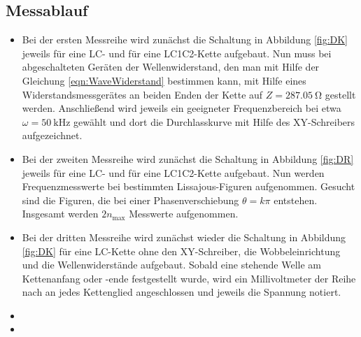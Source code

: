 \subsection{Messablauf}

\begin{itemize}

\item
Bei der ersten Messreihe wird zunächst die Schaltung in Abbildung
\ref{fig:DK} jeweils für eine LC- und für eine LC1C2-Kette aufgebaut. Nun muss
bei abgeschalteten Geräten der Wellenwiderstand, den man mit Hilfe der
Gleichung \eqref{eqn:WaveWiderstand} bestimmen kann, mit Hilfe eines
Widerstandsmessgerätes
an beiden Enden der Kette auf $Z = \SI{287.05}{\ohm}$ gestellt werden.
Anschließend wird jeweils ein geeigneter Frequenzbereich bei etwa $\omega =
\SI{50}{\kilo\Hz}$ gewählt und dort die Durchlasskurve mit Hilfe des
XY-Schreibers aufgezeichnet.

\item
Bei der zweiten Messreihe wird zunächst die Schaltung in Abbildung
\ref{fig:DR} jeweils für eine LC- und für eine LC1C2-Kette aufgebaut.
Nun werden Frequenzmesswerte bei bestimmten Lissajous-Figuren aufgenommen.
Gesucht sind die Figuren, die bei einer Phasenverschiebung $\theta = k\pi$
entstehen. Insgesamt werden $2 n_\text{max}$ Messwerte aufgenommen.

\item
Bei der dritten Messreihe wird zunächst wieder die Schaltung in Abbildung
\ref{fig:DK} für eine LC-Kette ohne den XY-Schreiber, die
Wobbeleinrichtung und die Wellenwiderstände aufgebaut. Sobald eine
stehende Welle am Kettenanfang oder -ende festgestellt wurde, wird ein
Millivoltmeter der Reihe nach an jedes Kettenglied angeschlossen und jeweils
die Spannung notiert.

\item

\item

\end{itemize}
